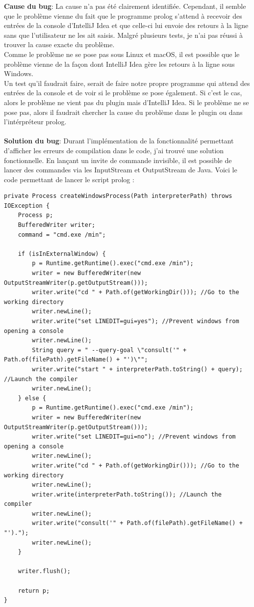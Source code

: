 \noindent \textbf{Cause du bug}: La cause n'a pas été clairement identifiée. Cependant, il semble que le problème vienne du fait que le programme prolog s'attend à recevoir des entrées de la console d'IntelliJ Idea et que celle-ci lui envoie des retours à la ligne sans que l'utilisateur ne les ait saisis. Malgré plusieurs tests, je n'ai pas réussi à trouver la cause exacte du problème.
\\
Comme le problème ne se pose pas sous Linux et macOS, il est possible que le problème vienne de la façon dont IntelliJ Idea gère les retours à la ligne sous Windows.
\\
Un test qu'il faudrait faire, serait de faire notre propre programme qui attend des entrées de la console et de voir si le problème se pose également. Si c'est le cas, alors le problème ne vient pas du plugin mais d'IntelliJ Idea. Si le problème ne se pose pas, alors il faudrait chercher la cause du problème dans le plugin ou dans l'intérpréteur prolog.
\\
\\
\textbf{Solution du bug}: Durant l'implémentation de la fonctionnalité permettant d'afficher les erreurs de compilation dans le code, j'ai trouvé une solution fonctionnelle.
\newdoubleline En lançant un invite de commande invisible, il est possible de lancer des commandes via les InputStream et OutputStream de Java. Voici le code permettant de lancer le script prolog :
\begin{lstlisting}[caption={Code permettant de lancer le script prolog}, label={lst:run_script_prolog}]
private Process createWindowsProcess(Path interpreterPath) throws IOException {
    Process p;
    BufferedWriter writer;
    command = "cmd.exe /min";

    if (isInExternalWindow) {
        p = Runtime.getRuntime().exec("cmd.exe /min");
        writer = new BufferedWriter(new OutputStreamWriter(p.getOutputStream()));
        writer.write("cd " + Path.of(getWorkingDir())); //Go to the working directory
        writer.newLine();
        writer.write("set LINEDIT=gui=yes"); //Prevent windows from opening a console
        writer.newLine();
        String query = " --query-goal \"consult('" + Path.of(filePath).getFileName() + "')\"";
        writer.write("start " + interpreterPath.toString() + query); //Launch the compiler
        writer.newLine();
    } else {
        p = Runtime.getRuntime().exec("cmd.exe /min");
        writer = new BufferedWriter(new OutputStreamWriter(p.getOutputStream()));
        writer.write("set LINEDIT=gui=no"); //Prevent windows from opening a console
        writer.newLine();
        writer.write("cd " + Path.of(getWorkingDir())); //Go to the working directory
        writer.newLine();
        writer.write(interpreterPath.toString()); //Launch the compiler
        writer.newLine();
        writer.write("consult('" + Path.of(filePath).getFileName() + "').");
        writer.newLine();
    }

    writer.flush();

    return p;
}
\end{lstlisting}


